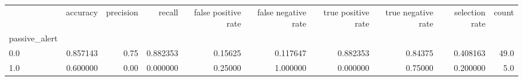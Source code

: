 \begin{tabular}{lrrrrrrrrr}
\toprule
{} &  accuracy &  precision &    recall &  false positive rate &  false negative rate &  true positive rate &  true negative rate &  selection rate &  count \\
passive\_alert &           &            &           &                      &                      &                     &                     &                 &        \\
\midrule
0.0           &  0.857143 &       0.75 &  0.882353 &              0.15625 &             0.117647 &            0.882353 &             0.84375 &        0.408163 &   49.0 \\
1.0           &  0.600000 &       0.00 &  0.000000 &              0.25000 &             1.000000 &            0.000000 &             0.75000 &        0.200000 &    5.0 \\
\bottomrule
\end{tabular}
